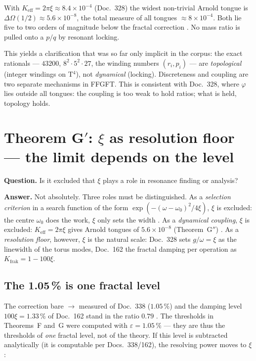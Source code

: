 With $K_\mathrm{eff} = 2\pi\xi \approx 8.4 \times 10^{-4}$ (Doc.~328) the
widest non-trivial Arnold tongue is $\Delta\Omega(1/2) \approx 5.6 \times
10^{-8}$, the total measure of all tongues $\approx 8 \times 10^{-4}$. Both
lie five to two orders of magnitude below the fractal correction \BM. No mass
ratio is pulled onto a $p/q$ by resonant locking.

This yields a clarification that was so far only implicit in the corpus: the
exact rationals --- $43200$, $8^2 \cdot 5^2 \cdot 27$, the winding numbers
$(r_i, p_i)$ --- are \emph{topological} (integer windings on T$^4$), not
\emph{dynamical} (locking). Discreteness and coupling are two separate
mechanisms in FFGFT. This is consistent with Doc.~328, where $\varphi$ lies
outside all tongues: the coupling is too weak to hold ratios; what is held,
topology holds.

\section{Theorem G$'$: $\xi$ as resolution floor --- the limit depends on the level}

\textbf{Question.} Is it excluded that $\xi$ plays a role in resonance finding
or analysis?

\textbf{Answer.} Not absolutely. Three roles must be distinguished. As a
\emph{selection criterion} in a search function of the form
$\exp(-(\omega-\omega_0)^2/4\xi)$, $\xi$ is excluded: the centre $\omega_0$ does
the work, $\xi$ only sets the width \BM. As a \emph{dynamical coupling}, $\xi$
is excluded: $K_\mathrm{eff}=2\pi\xi$ gives Arnold tongues of $5.6\times10^{-8}$
(Theorem~G$''$) \BM. As a \emph{resolution floor}, however, $\xi$ is the natural
scale: Doc.~328 sets $g/\omega=\xi$ as the linewidth of the torus modes,
Doc.~162 the fractal damping per operation as $K_\mathrm{frak}=1-100\xi$.

\subsection{The 1.05\,\% is one fractal level}

The correction bare $\to$ measured of Doc.~338 ($1.05\,\%$) and the damping
level $100\xi=1.33\,\%$ of Doc.~162 stand in the ratio $0.79$ \BM. The
thresholds in Theorems~F and~G were computed with $\varepsilon=1.05\,\%$ ---
they are thus the thresholds of \emph{one} fractal level, not of the theory.
If this level is subtracted analytically (it is computable per Docs.~338/162),
the resolving power moves to $\xi$:

